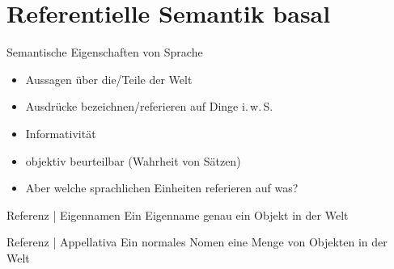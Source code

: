 \section{Referentielle Semantik basal}

\begin{frame}
  {Semantische Eigenschaften von Sprache}
  \onslide<+->
  \begin{itemize}[<+->]
    \item Aussagen über die\slash Teile der Welt
    \item Ausdrücke bezeichnen\slash referieren auf Dinge i.\,w.\,S.
    \item Informativität
    \item objektiv beurteilbar (\zB Wahrheit von Sätzen)
      \Zeile
    \item \alert{Aber welche sprachlichen Einheiten referieren auf was?}
  \end{itemize}
\end{frame}

\begin{frame}
  {Referenz | Eigennamen}
  \onslide<+->
  \onslide<+->
  Ein \alert{Eigenname}  \alert{genau ein Objekt} in der Welt\\
  \onslide<+->
  \Zeile
  \centering
\end{frame}

\begin{frame}
  {Referenz | Appellativa}
  \onslide<+->
  \onslide<+->
  Ein normales \alert{Nomen}  \alert{eine Menge von Objekten} in der Welt\\
  \onslide<+->
  \Zeile
  \centering
\end{frame}

